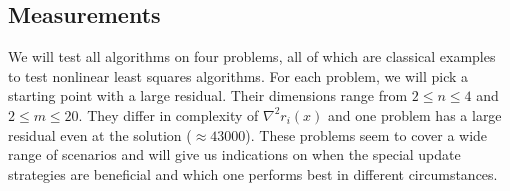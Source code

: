 \documentclass{article}
\begin{document}
\subsection{Measurements}
We will test all algorithms on four problems, all of which are classical examples
to test nonlinear least squares algorithms. For each problem, we will pick a starting point
with a large residual. Their dimensions range from $2\leq n \leq 4$ and $2\leq m \leq 20$.
They differ in complexity of $\nabla^2 r_i(x)$ and one problem has a large residual even at
the solution ($\approx 43000$). These problems seem to cover a wide range of scenarios and
will give us indications on when the special update strategies are beneficial and which one 
performs best in different circumstances. 


\end{document}
